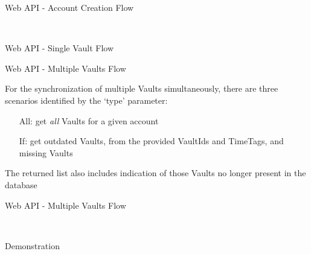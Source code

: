 \documentclass[newPxFont,noprogressbar,table]{beamer}
\begin{document}
\begin{frame}{Web API - Account Creation Flow}

\vspace*{-3em}
\hspace*{-1em}
\\

\end{frame}

\begin{frame}{Web API - Single Vault Flow}
\vspace*{-3em}
\\

\end{frame}

\begin{frame}{Web API - Multiple Vaults Flow}

\vspace*{-4em}
For the synchronization of multiple \textcolor{sthlmBlue}{Vaults} simultaneously, there are three scenarios identified by the `type' parameter:

\begin{itemize}
\item[All:] get \emph{all} \textcolor{sthlmBlue}{Vaults} for a given account
\item[If:] get outdated \textcolor{sthlmBlue}{Vaults}, from the provided \textcolor{sthlmBlue}{VaultIds} and \textcolor{sthlmBlue}{TimeTags}, and missing \textcolor{sthlmBlue}{Vaults}
\end{itemize}

The returned list also includes indication of those \textcolor{sthlmBlue}{Vaults} no longer present in the database

\end{frame}

\begin{frame}{Web API - Multiple Vaults Flow}

\vspace*{-3em}
\\

\end{frame}

\begin{frame}

\vspace*{4em}
\centering
{\LARGE \textcolor{sthlmBlue}{Demonstration} }

\end{frame}
\end{document}
